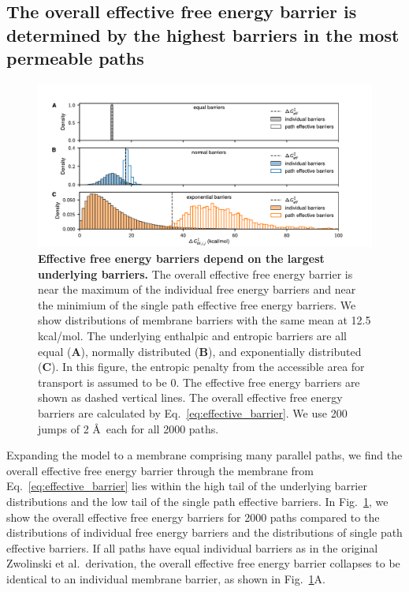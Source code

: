 \documentclass[12pt]{article}
\begin{document}
\subsection*{The overall effective free energy barrier is determined by the highest barriers in the most permeable paths}

\begin{figure}[ht!]
    \includegraphics[width=\textwidth]{figures/fig3.pdf}
    \caption{\textbf{Effective free energy barriers depend on the largest underlying barriers.} The overall effective free energy barrier is near the maximum of the individual free energy barriers and near the minimium of the single path effective free energy barriers. We show distributions of membrane barriers with the same mean at 12.5 kcal/mol. The underlying enthalpic and entropic barriers are all equal (\textbf{A}), normally distributed (\textbf{B}), and exponentially distributed (\textbf{C}). In this figure, the entropic penalty from the accessible area for transport is assumed to be 0. The effective free energy barriers are shown as dashed vertical lines. The overall effective free energy barriers are calculated by Eq.~\ref{eq:effective_barrier}. We use 200 jumps of 2 \AA~each for all 2000 paths.}
    \label{fig:effective_barriers_parallel}
\end{figure}

Expanding the model to a membrane comprising many parallel paths, we find the overall effective free energy barrier through the membrane from Eq.~\ref{eq:effective_barrier} lies within the high tail of the underlying barrier distributions and the low tail of the single path effective barriers. In Fig.~\ref{fig:effective_barriers_parallel}, we show the overall effective free energy barriers for 2000 paths compared to the distributions of individual free energy barriers and the distributions of single path effective barriers. If all paths have equal individual barriers as in the original Zwolinski et al.~derivation, the overall effective free energy barrier collapses to be identical to an individual membrane barrier, as shown in Fig.~\ref{fig:effective_barriers_parallel}A. 
\end{document}
